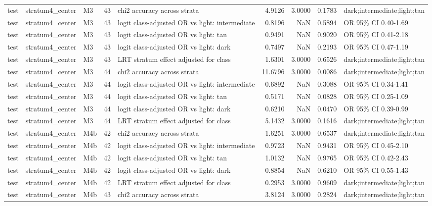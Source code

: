 \begin{tabular}{lllrlrrrl}
test & stratum4\_center & M3 & 43 & chi2 accuracy across strata & 4.9126 & 3.0000 & 0.1783 & dark;intermediate;light;tan \\
test & stratum4\_center & M3 & 43 & logit class-adjusted OR vs light: intermediate & 0.8196 & NaN & 0.5894 & OR 95\% CI 0.40-1.69 \\
test & stratum4\_center & M3 & 43 & logit class-adjusted OR vs light: tan & 0.9491 & NaN & 0.9020 & OR 95\% CI 0.41-2.18 \\
test & stratum4\_center & M3 & 43 & logit class-adjusted OR vs light: dark & 0.7497 & NaN & 0.2193 & OR 95\% CI 0.47-1.19 \\
test & stratum4\_center & M3 & 43 & LRT stratum effect adjusted for class & 1.6301 & 3.0000 & 0.6526 & dark;intermediate;light;tan \\
test & stratum4\_center & M3 & 44 & chi2 accuracy across strata & 11.6796 & 3.0000 & 0.0086 & dark;intermediate;light;tan \\
test & stratum4\_center & M3 & 44 & logit class-adjusted OR vs light: intermediate & 0.6892 & NaN & 0.3088 & OR 95\% CI 0.34-1.41 \\
test & stratum4\_center & M3 & 44 & logit class-adjusted OR vs light: tan & 0.5171 & NaN & 0.0828 & OR 95\% CI 0.25-1.09 \\
test & stratum4\_center & M3 & 44 & logit class-adjusted OR vs light: dark & 0.6210 & NaN & 0.0470 & OR 95\% CI 0.39-0.99 \\
test & stratum4\_center & M3 & 44 & LRT stratum effect adjusted for class & 5.1432 & 3.0000 & 0.1616 & dark;intermediate;light;tan \\
test & stratum4\_center & M4b & 42 & chi2 accuracy across strata & 1.6251 & 3.0000 & 0.6537 & dark;intermediate;light;tan \\
test & stratum4\_center & M4b & 42 & logit class-adjusted OR vs light: intermediate & 0.9723 & NaN & 0.9431 & OR 95\% CI 0.45-2.10 \\
test & stratum4\_center & M4b & 42 & logit class-adjusted OR vs light: tan & 1.0132 & NaN & 0.9765 & OR 95\% CI 0.42-2.43 \\
test & stratum4\_center & M4b & 42 & logit class-adjusted OR vs light: dark & 0.8854 & NaN & 0.6210 & OR 95\% CI 0.55-1.43 \\
test & stratum4\_center & M4b & 42 & LRT stratum effect adjusted for class & 0.2953 & 3.0000 & 0.9609 & dark;intermediate;light;tan \\
test & stratum4\_center & M4b & 43 & chi2 accuracy across strata & 3.8124 & 3.0000 & 0.2824 & dark;intermediate;light;tan \\

\end{tabular}

